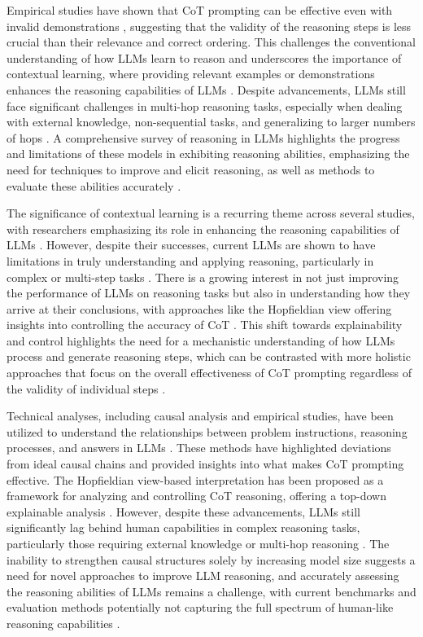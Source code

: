 \documentclass[conference]{IEEEtran}
\begin{document}
Empirical studies have shown that CoT prompting can be effective even with invalid demonstrations \cite{b5}, suggesting that the validity of the reasoning steps is less crucial than their relevance and correct ordering. This challenges the conventional understanding of how LLMs learn to reason and underscores the importance of contextual learning, where providing relevant examples or demonstrations enhances the reasoning capabilities of LLMs \cite{b6}. Despite advancements, LLMs still face significant challenges in multi-hop reasoning tasks, especially when dealing with external knowledge, non-sequential tasks, and generalizing to larger numbers of hops \cite{b7}. A comprehensive survey of reasoning in LLMs highlights the progress and limitations of these models in exhibiting reasoning abilities, emphasizing the need for techniques to improve and elicit reasoning, as well as methods to evaluate these abilities accurately \cite{b8}.

The significance of contextual learning is a recurring theme across several studies, with researchers emphasizing its role in enhancing the reasoning capabilities of LLMs \cite{b9}. However, despite their successes, current LLMs are shown to have limitations in truly understanding and applying reasoning, particularly in complex or multi-step tasks \cite{b10}. There is a growing interest in not just improving the performance of LLMs on reasoning tasks but also in understanding how they arrive at their conclusions, with approaches like the Hopfieldian view offering insights into controlling the accuracy of CoT \cite{b11}. This shift towards explainability and control highlights the need for a mechanistic understanding of how LLMs process and generate reasoning steps, which can be contrasted with more holistic approaches that focus on the overall effectiveness of CoT prompting regardless of the validity of individual steps \cite{b12}.

Technical analyses, including causal analysis and empirical studies, have been utilized to understand the relationships between problem instructions, reasoning processes, and answers in LLMs \cite{b13}. These methods have highlighted deviations from ideal causal chains and provided insights into what makes CoT prompting effective. The Hopfieldian view-based interpretation has been proposed as a framework for analyzing and controlling CoT reasoning, offering a top-down explainable analysis \cite{b14}. However, despite these advancements, LLMs still significantly lag behind human capabilities in complex reasoning tasks, particularly those requiring external knowledge or multi-hop reasoning \cite{b15}. The inability to strengthen causal structures solely by increasing model size suggests a need for novel approaches to improve LLM reasoning, and accurately assessing the reasoning abilities of LLMs remains a challenge, with current benchmarks and evaluation methods potentially not capturing the full spectrum of human-like reasoning capabilities \cite{b16}.
\end{document}
